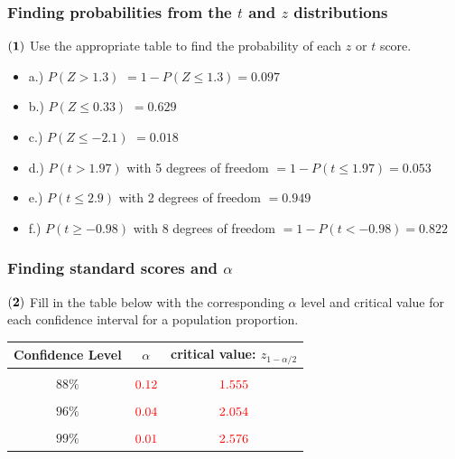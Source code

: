 \documentclass[
]{article}
\begin{document}
\subsubsection{\texorpdfstring{Finding probabilities from the \(t\) and
\(z\)
distributions}{Finding probabilities from the t and z distributions}}\label{finding-probabilities-from-the-t-and-z-distributions}

\(\bf (1)\) Use the appropriate table to find the probability of each
\(z\) or \(t\) score.

\begin{itemize}
\item
  a.) \(P(Z > 1.3)\) { \(=1-P(Z\leq 1.3) = 0.097\) }
\item
  b.) \(P(Z \leq 0.33)\) { \(=0.629\) }
\item
  c.) \(P(Z \leq -2.1)\) { \(=0.018\) }
\item
  d.) \(P(t > 1.97)\) with 5 degrees of freedom {
  \(= 1 - P(t \leq 1.97) = 0.053\) }
\item
  e.) \(P(t \leq 2.9)\) with 2 degrees of freedom { \(= 0.949\) }
\item
  f.) \(P(t \geq -0.98)\) with 8 degrees of freedom {
  \(= 1 - P(t < -0.98) = 0.822\) }
\end{itemize}

\subsubsection{\texorpdfstring{Finding standard scores and
\(\alpha\)}{Finding standard scores and \textbackslash alpha}}\label{finding-standard-scores-and-alpha}

\(\bf (2)\) Fill in the table below with the corresponding \(\alpha\)
level and critical value for each confidence interval for a population
proportion.

\begin{table}[H]
\centering\centering
\begin{tabular}{ccc}
\toprule
Confidence Level & $\alpha$ & critical value: $z_{1-\alpha/2}$\\
\midrule
\cellcolor{gray!10}{$90\%$} & \cellcolor{gray!10}{$\color{red}{0.1}$} & \cellcolor{gray!10}{$\color{red}{1.645}$}\\
$88\%$ & $\color{red}{0.12}$ & $\color{red}{1.555}$\\
\cellcolor{gray!10}{$97\%$} & \cellcolor{gray!10}{$\color{red}{0.03}$} & \cellcolor{gray!10}{$\color{red}{2.17}$}\\
$96\%$ & $\color{red}{0.04}$ & $\color{red}{2.054}$\\
\cellcolor{gray!10}{$78\%$} & \cellcolor{gray!10}{$\color{red}{0.22}$} & \cellcolor{gray!10}{$\color{red}{1.227}$}\\
\addlinespace
$99\%$ & $\color{red}{0.01}$ & $\color{red}{2.576}$\\
\bottomrule
\end{tabular}
\end{table}
\end{document}
